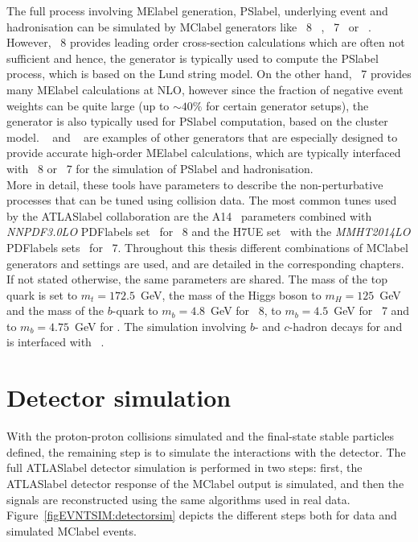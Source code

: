 The full process involving \acrshort{MElabel} generation, \acrshort{PSlabel}, underlying event and hadronisation can be simulated by \acrshort{MClabel} generators like \PYTHIA~8~\cite{SJOSTRAND2015159}
, \HERWIG~7~\cite{Bahr2008,Bellm2016}
or \SHERPA~\cite{10.21468SciPostPhys.7.3.034}. However, \PYTHIA~8 provides leading order cross-section calculations which are often not sufficient and hence, the generator is typically used to compute the \acrshort{PSlabel} process, which is based on the Lund string model. On the other hand, \HERWIG~7 provides many \acrshort{MElabel} calculations at NLO, however since the fraction of negative event weights can be quite large (up to $\sim40\%$ for certain generator setups), the generator is also typically used for \acrshort{PSlabel} computation, based on the cluster model. \POWHEGBOX~\cite{Nason_2004,Frixione_2007,Alioli2010,PhysRevD.91.094003,Frixione_20072}
and \MGMCatNLO~\cite{Alwall_2007}
are examples of other generators that are especially designed to provide accurate high-order \acrshort{MElabel} calculations, which are typically interfaced with \PYTHIA~8 or \HERWIG~7 for the simulation of \acrshort{PSlabel} and hadronisation.\\

More in detail, these tools have parameters to describe the non-perturbative processes that can be tuned using collision data. The most common tunes used by the \acrshort{ATLASlabel} collaboration are the A14~\cite{ATL-PHYS-PUB-2014-021} parameters combined with \textit{NNPDF3.0LO} \acrshort{PDFlabel}s set~\cite{BALL2013244} for \PYTHIA~8 and the H7UE set~\cite{Bellm2016} with the \textit{MMHT2014LO} \acrshort{PDFlabel}s sets~\cite{Harland-Lang2015} for \HERWIG~7. Throughout this thesis different combinations of \acrshort{MClabel} generators and settings are used, and are detailed in the corresponding chapters. If not stated otherwise, the same parameters are shared. The mass of the top quark is set to $m_t=172.5$~GeV, the mass of the Higgs boson to $m_H=125$~GeV and the mass of the $b$-quark to $m_b=4.8$~GeV for \PYTHIA~8, to $m_b=4.5$~GeV for \HERWIG~7 and to $m_b=4.75$~GeV for \SHERPA. The simulation involving $b$- and $c$-hadron decays for \PYTHIA and \HERWIG is interfaced with \EVTGEN~\cite{LANGE2001152}. 

\section{Detector simulation}

With the proton-proton collisions simulated and the final-state stable particles defined, the remaining step is to simulate the interactions with the detector. The full \acrshort{ATLASlabel} detector simulation is performed in two steps: first, the \acrshort{ATLASlabel} detector response of the \acrshort{MClabel} output is simulated, and then the signals are reconstructed using the same algorithms used in real data. Figure~\ref{figEVNTSIM:detectorsim} depicts the different steps both for data and simulated \acrshort{MClabel} events.\\

